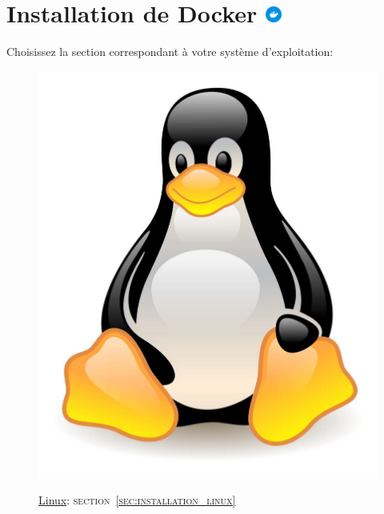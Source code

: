 \section[Installation de Docker]{Installation de Docker \includegraphics[height=15pt]{figures-logos/docker.pdf}}

Choisissez la section correspondant à votre système d'exploitation:

\begin{figure}[!h]
    \centering
    \begin{minipage}{0.32\textwidth}
        \centering
        \hyperref[sec:installation_linux]{\includegraphics[scale=0.05]{Images_formation/LinuxLogo.pdf}}
        \caption*{\underline{Linux}: \textsc{section~\ref{sec:installation_linux}}}
    \end{minipage} 
    \begin{minipage}{0.32\textwidth}
        \centering

\end{minipage}
\end{figure}
